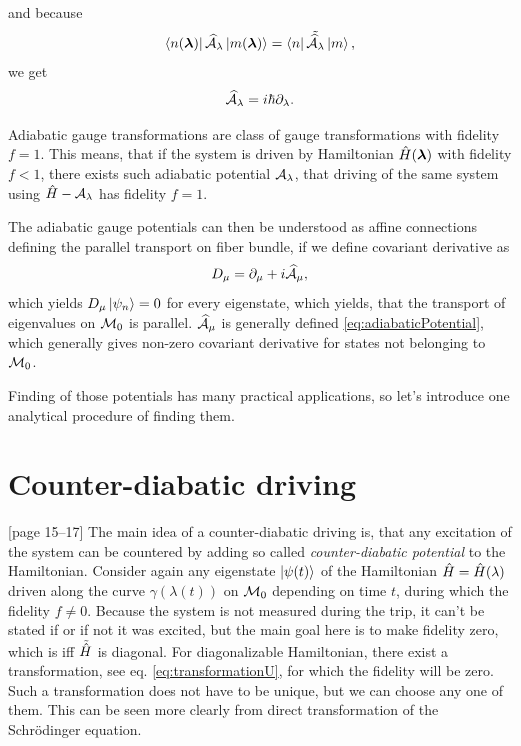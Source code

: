 and because
\begin{equation}
    \bra{n(\llambda)}\AA_\lambda\ket{ m(\llambda)}= \bra{n}\tilde{\AA_\lambda}\ket{m},
\end{equation}
we get
\begin{equation}
    \AA_\lambda = i\hbar\partial_\lambda.
    \label{eq:adiabaticPotentialDefinition}
\end{equation}



Adiabatic gauge transformations are  class of gauge transformations with fidelity $f=1$. This means, that if the system is driven by Hamiltonian $\HH(\llambda)$ with fidelity $f<1$, there exists such adiabatic potential $\A_\lambda$, that driving of the same system using $\HH-\A_\lambda$ has fidelity $f=1$.

The adiabatic gauge potentials can then be understood as affine connections defining the parallel transport on fiber bundle, if we define covariant derivative as
\begin{equation}
    D_\mu=\partial_\mu+i\AA_\mu,
\end{equation}
which yields $D_\mu\ket{\psi_n}=0$ for every eigenstate, which yields, that the transport of eigenvalues on $\M_0$ is parallel. $\AA_\mu$ is generally defined \ref{eq:adiabaticPotential}, which generally gives non-zero covariant derivative for states not belonging to $\M_0$. 

Finding of those potentials has many practical applications, so let's introduce one analytical procedure of finding them.





\section{Counter-diabatic driving}
\label{chap:CounterDiabaticDriving}
\citep{kolodrubez}[page 15--17] The main idea of a counter-diabatic driving is, that any excitation of the system can be countered by adding so called \emph{counter-diabatic potential} to the Hamiltonian. Consider again any eigenstate $\kpsit$ of the Hamiltonian $\HH=\HH(\lambda)$ driven along the curve $\gamma(\lambda(t))$ on $\M_0$ depending on time $t$, during which the fidelity $f\neq 0$. Because the system is not measured during the trip, it can't be stated if or if not it was excited, but the main goal here is to make fidelity zero, which is iff $\tilde\HH$ is diagonal. For diagonalizable Hamiltonian, there exist a transformation, see eq. \ref{eq:transformationU}, for which the fidelity will be zero. Such a transformation does not have to be unique, but we can choose any one of them. This can be seen more clearly from direct transformation of the Schrödinger equation. 

